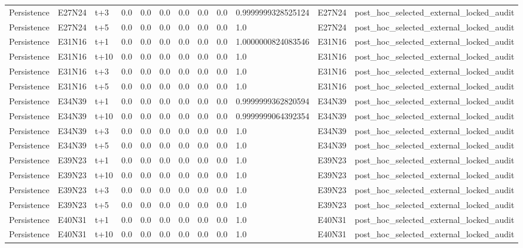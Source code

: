 \begin{landscape}
\begin{longtable}{llllllllllll}
Persistence & E27N24 & t+3 & 0.0 & 0.0 & 0.0 & 0.0 & 0.0 & 0.0 & 0.9999999328525124 & E27N24 & post\_hoc\_selected\_external\_locked\_audit \\
Persistence & E27N24 & t+5 & 0.0 & 0.0 & 0.0 & 0.0 & 0.0 & 0.0 & 1.0 & E27N24 & post\_hoc\_selected\_external\_locked\_audit \\
Persistence & E31N16 & t+1 & 0.0 & 0.0 & 0.0 & 0.0 & 0.0 & 0.0 & 1.0000000824083546 & E31N16 & post\_hoc\_selected\_external\_locked\_audit \\
Persistence & E31N16 & t+10 & 0.0 & 0.0 & 0.0 & 0.0 & 0.0 & 0.0 & 1.0 & E31N16 & post\_hoc\_selected\_external\_locked\_audit \\
Persistence & E31N16 & t+3 & 0.0 & 0.0 & 0.0 & 0.0 & 0.0 & 0.0 & 1.0 & E31N16 & post\_hoc\_selected\_external\_locked\_audit \\
Persistence & E31N16 & t+5 & 0.0 & 0.0 & 0.0 & 0.0 & 0.0 & 0.0 & 1.0 & E31N16 & post\_hoc\_selected\_external\_locked\_audit \\
Persistence & E34N39 & t+1 & 0.0 & 0.0 & 0.0 & 0.0 & 0.0 & 0.0 & 0.9999999362820594 & E34N39 & post\_hoc\_selected\_external\_locked\_audit \\
Persistence & E34N39 & t+10 & 0.0 & 0.0 & 0.0 & 0.0 & 0.0 & 0.0 & 0.9999999064392354 & E34N39 & post\_hoc\_selected\_external\_locked\_audit \\
Persistence & E34N39 & t+3 & 0.0 & 0.0 & 0.0 & 0.0 & 0.0 & 0.0 & 1.0 & E34N39 & post\_hoc\_selected\_external\_locked\_audit \\
Persistence & E34N39 & t+5 & 0.0 & 0.0 & 0.0 & 0.0 & 0.0 & 0.0 & 1.0 & E34N39 & post\_hoc\_selected\_external\_locked\_audit \\
Persistence & E39N23 & t+1 & 0.0 & 0.0 & 0.0 & 0.0 & 0.0 & 0.0 & 1.0 & E39N23 & post\_hoc\_selected\_external\_locked\_audit \\
Persistence & E39N23 & t+10 & 0.0 & 0.0 & 0.0 & 0.0 & 0.0 & 0.0 & 1.0 & E39N23 & post\_hoc\_selected\_external\_locked\_audit \\
Persistence & E39N23 & t+3 & 0.0 & 0.0 & 0.0 & 0.0 & 0.0 & 0.0 & 1.0 & E39N23 & post\_hoc\_selected\_external\_locked\_audit \\
Persistence & E39N23 & t+5 & 0.0 & 0.0 & 0.0 & 0.0 & 0.0 & 0.0 & 1.0 & E39N23 & post\_hoc\_selected\_external\_locked\_audit \\
Persistence & E40N31 & t+1 & 0.0 & 0.0 & 0.0 & 0.0 & 0.0 & 0.0 & 1.0 & E40N31 & post\_hoc\_selected\_external\_locked\_audit \\
Persistence & E40N31 & t+10 & 0.0 & 0.0 & 0.0 & 0.0 & 0.0 & 0.0 & 1.0 & E40N31 & post\_hoc\_selected\_external\_locked\_audit \\

\end{longtable}
\end{landscape}

